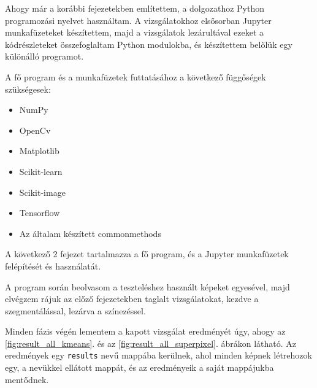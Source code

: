 
Ahogy már a korábbi fejezetekben említettem, a dolgozathoz Python programozási nyelvet használtam. A vizsgálatokhoz elsősorban Jupyter munkafüzeteket készítettem, majd a vizsgálatok lezárultával ezeket a kódrészleteket összefoglaltam Python modulokba, és készítettem belőlük egy különálló programot.

A fő program és a munkafüzetek futtatásához a következő függőségek szükségesek:
\begin{itemize}
\item NumPy
\item OpenCv
\item Matplotlib
\item Scikit-learn
\item Scikit-image
\item Tensorflow
\item Az általam készített commonmethods
\end{itemize}

A következő 2 fejezet tartalmazza a fő program, és a Jupyter munkafüzetek felépítését és használatát.

A program során beolvasom a teszteléshez használt képeket egyesével, majd elvégzem rájuk az előző fejezetekben taglalt vizsgálatokat, kezdve a szegmentálással, lezárva a színezéssel.

Minden fázis végén lementem a kapott vizsgálat eredményét úgy, ahogy az \ref{fig:result_all_kmeans}. és az \ref{fig:result_all_superpixel}. ábrákon látható. Az eredmények egy \texttt{results} nevű mappába kerülnek, ahol minden képnek létrehozok egy, a nevükkel ellátott mappát, és az eredményeik a saját mappájukba mentődnek.

